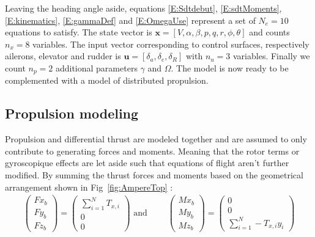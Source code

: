 Leaving the heading angle aside, equations \ref{E:Sdtdebut}, \ref{E:sdtMoments}, \ref{E:kinematics}, \ref{E:gammaDef} and \ref{E:OmegaUse} represent a set of $N_e=10$ equations to satisfy. The state vector is $\textbf{x}=[V,\alpha,\beta,p,q,r,\phi,\theta]$ and counts $n_x=8$ variables. The input vector corresponding to control surfaces, respectively ailerons, elevator and rudder is $\textbf{u}=[\delta_a, \delta_e, \delta_R]$ with $n_u=3$ variables. Finally we count $n_p=2$ additional parameters $\gamma$ and $\Omega$. The model is now ready to be complemented with a model of distributed propulsion.

\subsection{Propulsion modeling}

Propulsion and differential thrust are modeled together and are assumed to only contribute to generating forces and moments. Meaning that the rotor terms or gyroscopique effects are let aside such that equations of flight aren't further modified.
By summing the thrust forces and moments based on the geometrical arrangement shown in Fig~\ref{fig:AmpereTop} :
\begin{align}
\begin{pmatrix}
Fx_b\\
Fy_b\\
Fz_b
\end{pmatrix}
=
\begin{pmatrix}
\sum_{i=1}^{N} T_{x,i}\\
0\\
0
\end{pmatrix}
\text{ and }
\qquad
\begin{pmatrix}
Mx_b\\
My_b\\
Mz_b
\end{pmatrix}
=\begin{pmatrix}
0\\
0\\
\sum_{i=1}^{N} -T_{x,i} y_i
\end{pmatrix}
\end{align}

